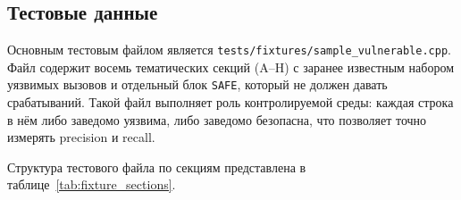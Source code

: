 \subsection{Тестовые данные}

Основным тестовым файлом является \texttt{tests/fixtures/sample\_vulnerable.cpp}.
Файл содержит восемь тематических секций (A--H) с заранее известным набором
уязвимых вызовов и отдельный блок \texttt{SAFE}, который не должен давать
срабатываний.
Такой файл выполняет роль контролируемой среды: каждая строка в нём
либо заведомо уязвима, либо заведомо безопасна, что позволяет точно
измерять precision и recall.

Структура тестового файла по секциям представлена в
таблице~\ref{tab:fixture_sections}.

